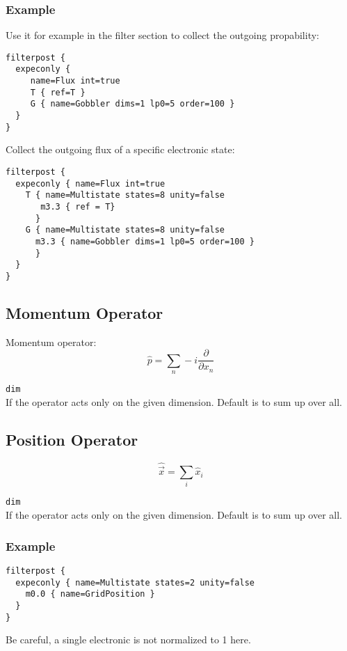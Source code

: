 \documentclass[a4paper,12pt]{scrbook}
\newcommand{\option}[2]{\item \texttt{#1}\\ #2}
\begin{document}
\subsubsection*{Example}
Use it for example in the filter section to collect the outgoing propability:
\begin{verbatim}
filterpost {
  expeconly {
     name=Flux int=true
     T { ref=T }
     G { name=Gobbler dims=1 lp0=5 order=100 }
  }
}
\end{verbatim}
Collect the outgoing flux of a specific electronic state:
\begin{verbatim}
filterpost {
  expeconly { name=Flux int=true
    T { name=Multistate states=8 unity=false
       m3.3 { ref = T}
      }
    G { name=Multistate states=8 unity=false
      m3.3 { name=Gobbler dims=1 lp0=5 order=100 }
      }
  }
}
\end{verbatim}

\subsection{Momentum Operator}
Momentum operator:
\begin{equation}
 \hat p = \sum_n -i \frac{\partial}{\partial x_n}
\end{equation}

\begin{options}
 \option{dim}{If the operator acts only on the given dimension. Default is to sum up over all.}
\end{options}

\subsection{Position Operator}
\begin{equation}
 \hat \vec{x} = \sum_i \hat x_i
\end{equation}

\begin{options}
 \option{dim}{If the operator acts only on the given dimension. Default is to sum up over all.}
\end{options}

\subsubsection*{Example}
\begin{verbatim}
filterpost {
  expeconly { name=Multistate states=2 unity=false 
    m0.0 { name=GridPosition }
  }
}
\end{verbatim}
Be careful, a single electronic is not normalized to 1 here.
\end{document}
